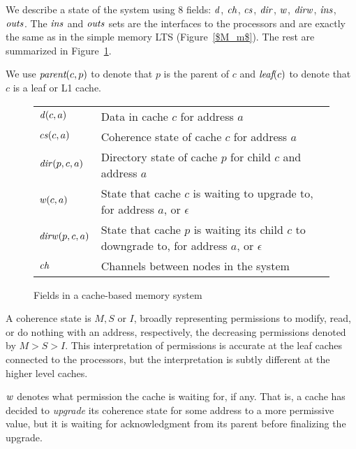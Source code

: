 We describe a state of the system using 8 fields: $\mathit{d}$, $\mathit{ch}$, $\mathit{cs}$, $\mathit{dir}$,
$\mathit{w}$, $\mathit{dirw}$, $\mathit{ins}$, $\mathit{outs}$. The $\mathit{ins}$ and $\mathit{outs}$ sets are the interfaces
to the processors and are exactly the same as in the simple memory LTS
(Figure~\ref{$M_m$}). The rest are summarized in Figure~\ref{fields}.

We use $\textit{parent}(c,p)$ to denote that $p$ is the parent of $c$ and $\textit{leaf}(c)$ to 
denote that $c$ is a leaf or L1 cache.

\begin{figure}[h]
\centering
\begin{tabular}{|l|p{6cm}|}
\hline
$\mathit{d}(c,a)$ & Data in cache $c$ for address $a$\\
$\mathit{cs}(c,a)$ & Coherence state of cache $c$ for address $a$\\
$\mathit{dir}(p,c,a)$ & Directory state of cache $p$ for child $c$ and address $a$\\
$\mathit{w}(c,a)$ & State that cache $c$ is waiting to upgrade to, for address $a$, or $\epsilon$\\ %
$\mathit{dirw}(p,c,a)$ & State that cache $p$ is waiting its child $c$ to downgrade to, for address $a$, or $\epsilon$\\
$\mathit{ch}$ & Channels between nodes in the system\\
\hline
\end{tabular}
\caption{Fields in a cache-based memory system}
\label{fields}
\end{figure}

A coherence state is $M, S$ or $I$, broadly representing permissions to modify,
read, or do nothing with an address, respectively, the decreasing permissions
denoted by $M > S > I$. This interpretation of permissions is accurate at the
leaf caches connected to the processors, but the
interpretation is subtly different at the higher level caches.

$\mathit{w}$ denotes what permission the cache is waiting for,
if any.  That is, a cache has decided to \emph{upgrade} its
coherence state for some address to a more permissive value, but
it is waiting for acknowledgment from its parent before
finalizing the upgrade.

